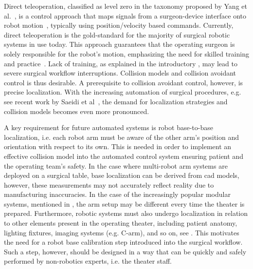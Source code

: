 Direct teleoperation, classified as level zero in the taxonomy proposed by Yang et al.~\cite{zhang2017automation}, is a control approach that maps signals from a surgeon-device interface onto robot motion~\cite{Niemeyer2008}, typically using position/velocity based commands.
Currently, direct teleoperation is the gold-standard for the majority of surgical robotic systems in use today. This approach guarantees that the operating surgeon is solely responsible for the robot's motion, emphasizing the need for skilled training and practice~\cite{Liu15}. Lack of training, as explained in the introductory , may lead to severe surgical workflow interruptions. Collision models and collision avoidant control is thus desirable. A prerequisite to collision avoidant control, however, is precise localization. With the increasing automation of surgical procedures, e.g. see recent work by Saeidi et al~\cite{Saeidi2022}, the demand for localization strategies and collision models becomes even more pronounced.


A key requirement for future automated systems is robot base-to-base localization, i.e. each robot arm must be aware of the other arm's position and orientation with respect to its own. This is needed in order to implement an effective collision model into the automated control system ensuring patient and the operating team's safety. In the case where multi-robot arm systems are deployed on a surgical table, base localization can be derived from \gls{cad} models, however, these measurements may not accurately reflect reality due to manufacturing inaccuracies. In the case of the increasingly popular modular systems, mentioned in , the arm setup may be different every time the theater is prepared. Furthermore, robotic systems must also undergo localization in relation to other elements present in the operating theater, including patient anatomy, lighting fixtures, imaging systems (e.g. C-arm), and so on, see . This motivates the need for a robot base calibration step introduced into the surgical workflow. Such a step, however, should be designed in a way that can be quickly and safely performed by non-robotics experts, i.e. the theater staff.


